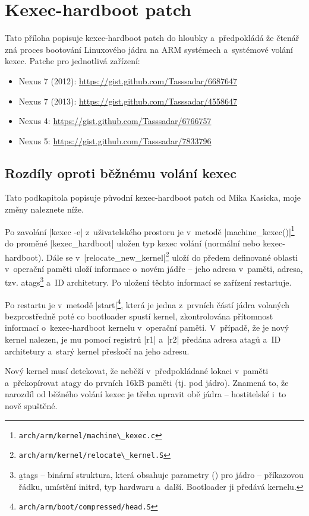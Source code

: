 \documentclass[12pt, a4paper, oneside]{article}
\begin{document}
\section*{Kexec-hardboot patch}
\label{sec:kexec-hardboot}
Tato příloha popisuje kexec-hardboot patch do hloubky a~předpokládá že čtenář zná proces bootování Linuxového jádra na ARM systémech a~systémové volání kexec. Patche pro jednotlivá zařízení:
\begin{itemize}
    \item Nexus 7 (2012): \url{https://gist.github.com/Tasssadar/6687647}
    \item Nexus 7 (2013): \url{https://gist.github.com/Tasssadar/4558647}
    \item Nexus 4: \url{https://gist.github.com/Tasssadar/6766757}
    \item Nexus 5: \url{https://gist.github.com/Tasssadar/7833796}
\end{itemize}

\subsection*{Rozdíly oproti běžnému volání kexec}
Tato podkapitola popisuje původní kexec-hardboot patch od Mika Kasicka, moje změny naleznete níže.

Po zavolání |kexec -e| z~uživatelského prostoru je v~metodě |machine_kexec()|\footnote{\verb-arch/arm/kernel/machine\_kexec.c-} do proměné |kexec_hardboot| uložen typ kexec volání (normální nebo kexec-hardboot). Dále se v~|relocate_new_kernel|\footnote{\verb-arch/arm/kernel/relocate\_kernel.S-} uloží do předem definované oblasti v~operační paměti uloží informace o~novém jádře -- jeho adresa v~paměti, adresa, tzv. atags\footnote{\b{atags} -- binární struktura, která obsahuje parametry () pro jádro -- příkazovou řádku, umístění initrd, typ hardwaru a~další. Bootloader ji předává kernelu.} a~ID architetury. Po uložení těchto informací se zařízení restartuje.

Po restartu je v~metodě |start|\footnote{\verb-arch/arm/boot/compressed/head.S-}, která je jedna z~prvních částí jádra volaných bezprostředně poté co bootloader spustí kernel, zkontrolována přítomnost informací o~kexec-hardboot kernelu v~operační paměti. V~případě, že je nový kernel nalezen, je mu pomocí registrů |r1| a~|r2| předána adresa atagů a~ID architetury a~starý kernel přeskočí na jeho adresu.

Nový kernel musí detekovat, že neběží v~předpokládané lokaci v~paměti a~překopírovat atagy do prvních 16kB paměti (tj. pod jádro). Znamená to, že narozdíl od běžného volání kexec je třeba upravit obě jádra -- hostitelské i~to nově spuštěné.
\end{document}
